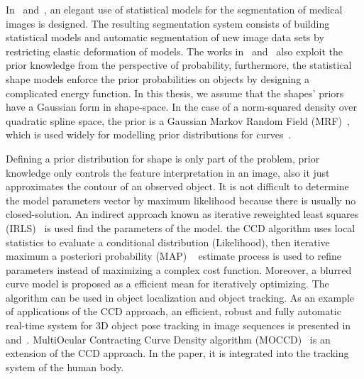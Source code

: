In~\cite{kelemen1999three} and~\cite{kelemen1999elastic}, an elegant
use of statistical models for the segmentation of medical images is
designed.  The resulting segmentation system consists of building
statistical models and automatic segmentation of new image data
sets by restricting elastic deformation of models.  The works
in~\cite{sclaroff2001deformable} and~\cite{liu1999deformable} also
exploit the prior knowledge from the perspective of probability,
furthermore, the statistical shape models enforce the prior
probabilities on objects by designing a complicated energy function.  In this thesis, we assume that the shapes' priors have a Gaussian form in
shape-space. In the case of a norm-squared density over  quadratic spline space,
the prior is a Gaussian Markov Random Field
(MRF)~\cite{blake1998active}, which is used widely  for modelling
prior distributions for curves~\cite{storvik1994bayesian}.

Defining a prior distribution for shape is only part of the
problem, prior knowledge only controls the feature interpretation in an
image, also it just approximates the contour of an observed object. It
is not difficult to determine the model parameters vector by maximum
likelihood because there is usually no closed-solution. An indirect
approach known as iterative reweighted least squares
(IRLS)~\cite{bishop2006pattern} is used find the parameters of the model.
the CCD  algorithm uses local statistics to evaluate a conditional distribution
(Likelihood), then iterative maximum a posteriori probability (MAP)
~\cite{sorenson1980parameter} estimate process is used to refine
parameters instead of maximizing a complex cost function. 
Moreover, a blurred curve model is proposed as a efficient mean for iteratively optimizing. The algorithm
can be used in object localization and object tracking. As an example
of applications of the CCD approach, an efficient, robust and fully
automatic real-time system for 3D object pose tracking in
image sequences is presented in~\cite{panin2006fully}
and~\cite{panin2006efficient}. MultiOcular Contracting Curve Density
algorithm (MOCCD)~\cite{hahn2007tracking} is an extension of the CCD
approach. In the paper, it is integrated into the tracking system of
the human body. 


